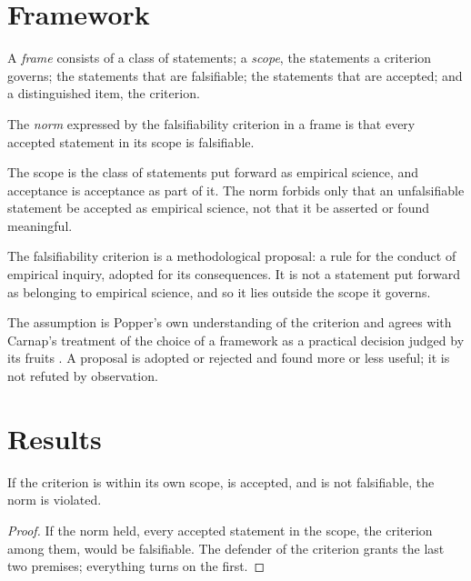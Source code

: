 \documentclass{situationist-preprint}
\begin{document}
\section{Framework}

\begin{definition}[Frame]\label{d:frame}
A \emph{frame} consists of a class of statements; a \emph{scope}, the statements a criterion governs; the statements that are falsifiable; the statements that are accepted; and a distinguished item, the criterion.
\end{definition}

\begin{definition}\label{d:norm}
The \emph{norm} expressed by the falsifiability criterion in a frame is that every accepted statement in its scope is falsifiable.
\end{definition}

The scope is the class of statements put forward as empirical science, and acceptance is acceptance as part of it. The norm forbids only that an unfalsifiable statement be accepted as empirical science, not that it be asserted or found meaningful.

\begin{assumption}[Proposal]\label{a:proposal}
The falsifiability criterion is a methodological proposal: a rule for the conduct of empirical inquiry, adopted for its consequences. It is not a statement put forward as belonging to empirical science, and so it lies outside the scope it governs.
\end{assumption}

The assumption is Popper's own understanding of the criterion and agrees with Carnap's treatment of the choice of a framework as a practical decision judged by its fruits \citep{Carnap1950}. A proposal is adopted or rejected and found more or less useful; it is not refuted by observation.

\section{Results}

\begin{proposition}\label{p:charge}
If the criterion is within its own scope, is accepted, and is not falsifiable, the norm is violated.
\end{proposition}

\begin{proof}
If the norm held, every accepted statement in the scope, the criterion among them, would be falsifiable. The defender of the criterion grants the last two premises; everything turns on the first.
\end{proof}
\end{document}
